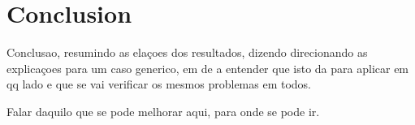 
%

\chapter{Conclusion}
\label{cha:conclusion}

Conclusao, resumindo as elaçoes dos resultados, dizendo direcionando as explicaçoes para um caso generico, em de a entender que isto da para aplicar em qq lado e que se vai verificar os mesmos problemas em todos.

Falar daquilo que se pode melhorar aqui, para onde se pode ir.